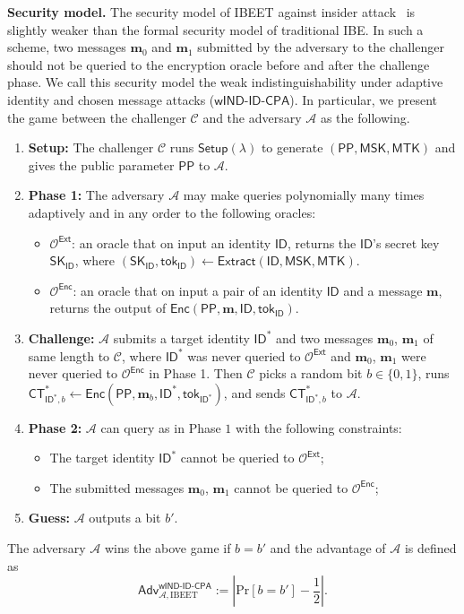 \documentclass[runningheads]{llncs}
\def\cal{\mathcal}
\def\bf{\mathbf}
\def\SK{\mathsf{SK}}
\def\PP{\mathsf{PP}}
\def\MSK{\mathsf{MSK}}
\def\MTK{\mathsf{MTK}}
\def\tok{\mathsf{tok}}
\def\CT{\mathsf{CT}}
\def\Setup{\mathsf{Setup}}
\def\Enc{\mathsf{Enc}}
\def\Extract{\mathsf{Extract}}
\def\Ext{\mathsf{Ext}}
\def\Dec{\mathsf{Dec}}
\def\Pr{\mathrm{Pr}}
\def\Adv{\mathsf{Adv}}
\def\wIND{\textsf{wIND-ID-CPA}}
\def\ID{\mathsf{ID}}
\begin{document}
\noindent\textbf{Security model.} The security model of IBEET against insider attack~\cite{IBEET-Wu17} is slightly weaker than the formal security model of traditional IBE. In such a scheme, two messages $\bf{m}_0$ and $\bf{m}_1$ submitted by the adversary to the challenger should not be queried to the encryption oracle before and after the challenge phase. We call this security model the weak indistinguishability under adaptive identity and chosen message attacks ($\wIND$). In particular, we present the game between the challenger $\cal{C}$ and the adversary $\cal{A}$ as the following.
\begin{enumerate} 
\item \textbf{Setup:} The challenger $\cal{C}$ runs $\Setup(\lambda)$ to generate $(\PP,\MSK,\MTK)$ and gives the public parameter $\PP$ to $\cal{A}$.
\item \textbf{Phase 1:}  The adversary $\cal{A}$ may make queries polynomially many times adaptively and in any order to the following oracles:
\begin{itemize}
	\item $\cal{O}^{\Ext}$: an oracle that on input an identity $\ID$, returns the $\ID$'s secret key $\SK_{\ID}$, where $(\SK_\ID,\tok_\ID)\gets\Extract(\ID,\MSK,\MTK)$.
	\item $\cal{O}^\Enc$: an oracle that on input a pair of an identity $\ID$ and a message $\bf{m}$, returns the output of $\Enc(\PP,\bf{m},\ID,\tok_{\ID})$.
\end{itemize}
\item \textbf{Challenge:} $\cal{A}$ submits a target identity $\ID^*$ and two messages $\bf{m}_0$, $\bf{m}_1$ of same length to $\cal{C}$, where $\ID^*$ was never queried to $\cal{O}^{\Ext}$ and  $\bf{m}_0$, $\bf{m}_1$ were never queried to $\cal{O}^\Enc$ in Phase 1. Then $\cal{C}$ picks a random bit $b\in\{0,1\}$, runs $\CT^*_{\ID^*,b}\gets\Enc(\PP,\bf{m}_b,\ID^*,\tok_{\ID^*})$, and sends $\CT^*_{\ID^*,b}$ to $\cal{A}$.
\item \textbf{Phase 2:} $\cal{A}$ can query as in Phase $1$ with the following constraints:
\begin{itemize}
	\item The target identity $\ID^*$ cannot be queried to  $\cal{O}^{\Ext}$;
	\item The submitted messages  $\bf{m}_0$, $\bf{m}_1$ cannot be queried to $\cal{O}^\Enc$;
\end{itemize}
\item \textbf{Guess:} $\cal{A}$ outputs a bit $b'$.
\end{enumerate}
The adversary $\cal{A}$ wins the above game if $b=b'$ and the advantage of $\cal{A}$ is defined as
$$\Adv_{\cal{A},\text{IBEET}}^{\wIND}:=\left|\Pr[b=b']-\frac{1}{2}\right|.$$
	
\end{document}
